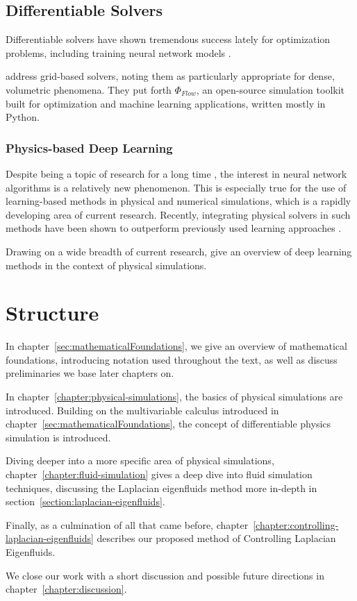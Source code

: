 \subsection{Differentiable Solvers}
Differentiable solvers have shown tremendous success lately for optimization
problems, including training neural network models
\cite{holl2019pdecontrol, difftaichi, warp2022}.

\citet{holl2019pdecontrol} address grid-based solvers, noting them as
particularly appropriate for dense, volumetric phenomena. They put forth
$\Phi_{Flow}$, an open-source simulation toolkit built for optimization and
machine learning applications, written mostly in Python.

\subsubsection*{Physics-based Deep Learning}
Despite being a topic of research for a long time \cite{backprop}, the
interest in neural network algorithms is a relatively new phenomenon. This is
especially true for the use of learning-based methods in physical and numerical
simulations, which is a rapidly developing area of current research. Recently,
integrating physical solvers in such methods have been shown to outperform
previously used learning approaches \cite{solver-in-the-loop}.

Drawing on a wide breadth of current research, \citet{pbdl} give an overview of
deep learning methods in the context of physical simulations. 

\section{Structure}
In chapter~\ref{sec:mathematicalFoundations}, we give an overview of
mathematical foundations, introducing notation used throughout the text, as well
as discuss  preliminaries we base later chapters on. 


In chapter~\ref{chapter:physical-simulations}, the basics of physical
simulations are introduced. Building on the multivariable calculus introduced in
chapter~\ref{sec:mathematicalFoundations}, the concept of differentiable physics
simulation is introduced. 

Diving deeper into a more specific area of physical simulations,
chapter~\ref{chapter:fluid-simulation} gives a deep dive into fluid simulation
techniques, discussing the Laplacian eigenfluids method more in-depth in
section~\ref{section:laplacian-eigenfluids}. 

Finally, as a culmination of all that came before,
chapter~\ref{chapter:controlling-laplacian-eigenfluids} describes our proposed
method of Controlling Laplacian Eigenfluids. 

We close our work with a short discussion and possible future directions in
chapter~\ref{chapter:discussion}.
